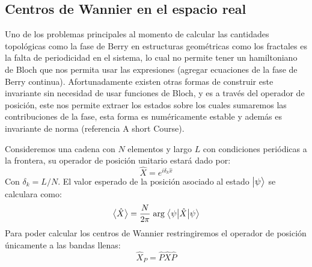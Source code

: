 \subsection{Centros de Wannier en el espacio real}

Uno de los problemas principales al momento de calcular las cantidades topológicas como la fase de Berry en estructuras geométricas como los fractales es la falta de periodicidad en el sistema, lo cual no permite tener un hamiltoniano de Bloch que nos permita usar las expresiones (agregar ecuaciones de la fase de Berry continua). Afortunadamente existen otras formas de construir este invariante sin necesidad de usar funciones de Bloch, y es a través del operador de posición, este nos permite extraer los estados sobre los cuales sumaremos las contribuciones de la fase, esta forma es numéricamente estable y además es invariante de norma (referencia A short Course).

Consideremos una cadena con $N$ elementos y largo $L$ con condiciones periódicas a la frontera, su operador de posición unitario estará dado por:
\begin{equation}
    \hat{X} = e^{i\delta_k \hat{x}}
\end{equation}
Con $\delta_k = L/N$. El valor esperado de la posición asociado al estado $\big |{\psi}\big \rangle$ se calculara como:
\begin{equation}
    \big \langle{\hat{X}} \big \rangle = \frac{N}{2\pi} \; \text{arg} \; \big \langle{\psi}\big | {\hat{X}} \big | {\psi} \big \rangle
\end{equation}
Para poder calcular los centros de Wannier restringiremos el operador de posición únicamente a las bandas llenas:
\begin{equation}
    \hat{X}_P = \hat{P} \hat{X} \hat{P}
\end{equation}

